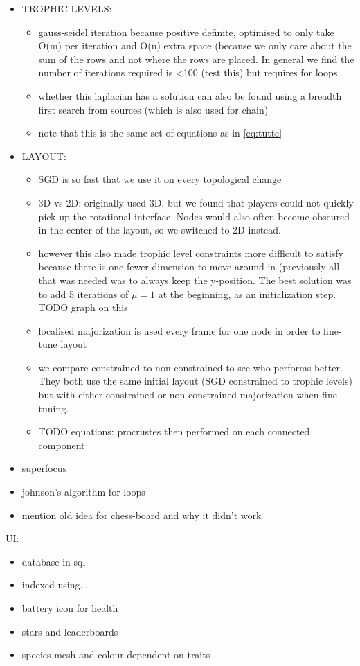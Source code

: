 \begin{itemize}
  \item TROPHIC LEVELS:
  \begin{itemize}
    \item gauss-seidel iteration because positive definite, optimised to only take O(m) per iteration and O(n) extra space (because we only care about the sum of the rows and not where the rows are placed. In general we find the number of iterations required is <100 (test this) but requires for loops~\cite{oliviasimpsonpaper}
    \item whether this laplacian has a solution can also be found using a breadth first search from sources (which is also used for chain)
    \item note that this is the same set of equations as in \eqref{eq:tutte}
  \end{itemize}
  \item LAYOUT:
  \begin{itemize}
    \item SGD is so fast that we use it on every topological change
    \item 3D vs 2D: originally used 3D, but we found that players could not quickly pick up the rotational interface. Nodes would also often become obscured in the center of the layout, so we switched to 2D instead. 
    \item however this also made trophic level constraints more difficult to satisfy because there is one fewer dimension to move around in (previously all that was needed was to always keep the y-position. The best solution was to add 5 iterations of $\mu=1$ at the beginning, as an initialization step. TODO graph on this
    \item localised majorization is used every frame for one node in order to fine-tune layout
    \item we compare constrained to non-constrained to see who performs better. They both use the same initial layout (SGD constrained to trophic levels) but with either constrained or non-constrained majorization when fine tuning.
    \item TODO equations: procrustes then performed on each connected component
  \end{itemize}
  
  \item superfocus
  \item johnson's algorithm for loops
  \item mention old idea for chess-board and why it didn't work
\end{itemize}
UI:
\begin{itemize}
  \item database in sql
  \item indexed using...
  \item battery icon for health
  \item stars and leaderboards
  \item species mesh and colour dependent on traits
\end{itemize}

